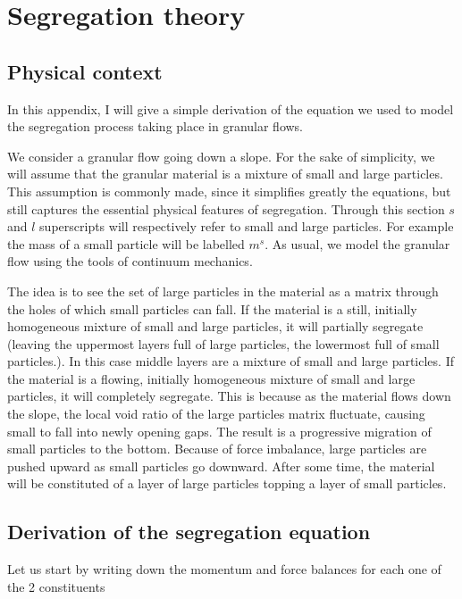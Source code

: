 \chapter{Segregation theory}
\label{app:segreg}

\section{Physical context}

In this appendix, I will give a simple derivation of the equation we used to model the segregation process taking place in granular flows.

We consider a granular flow going down a slope. For the sake of simplicity, we will assume that the granular material is a mixture of small and large particles. This assumption is commonly made, since it simplifies greatly the equations, but still captures the essential physical features of segregation. Through this section $s$ and $l$ superscripts will respectively refer to small and large particles. For example the mass of a small particle will be labelled $m^s$.
As usual, we model the granular flow using the tools of continuum mechanics. 

The idea is to see the set of large particles in the material as a matrix through the holes of which small particles can fall. 
If the material is a still, initially homogeneous mixture of small and large particles, it will partially segregate (leaving the uppermost layers full of large particles, the lowermost full of small particles.). In this case middle layers are a mixture of small and large particles.
If the material is a flowing, initially homogeneous mixture of small and large particles, it will completely segregate. This is because as the material flows down the slope, the local void ratio of the large particles matrix fluctuate, causing small to fall into newly opening gaps. The result is a progressive migration of small particles to the bottom. Because of force imbalance, large particles are pushed upward as small particles go downward. After some time, the material will be constituted of a layer of large particles topping a layer of small particles.

\section{Derivation of the segregation equation}

Let us start by writing down the momentum and force balances for each one of the 2 constituents

